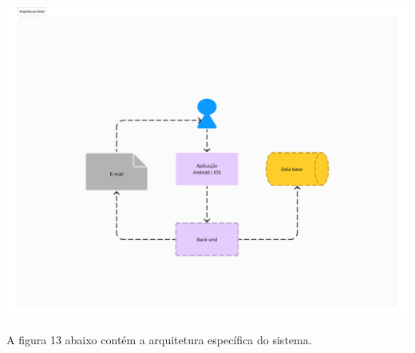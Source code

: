     \vspace{\baselineskip}
    \begin{center}
        \begin{minipage}{\textwidth}
            \centering
            \includegraphics[scale=0.2]{figs/arq_geral.png}
            \label{fig:arq-geral}
        \end{minipage}
    \end{center}

A figura 13 abaixo contém a arquitetura específica do sistema.

